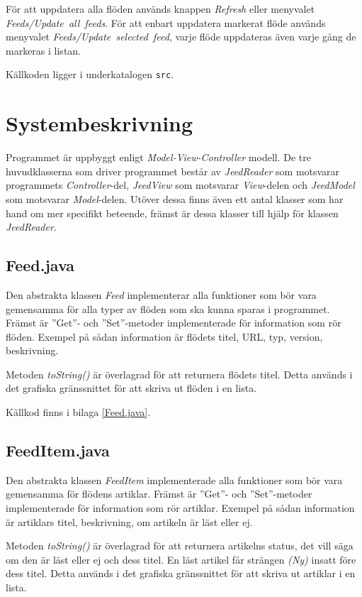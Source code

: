 \documentclass[a4paper, 12pt]{article}
\begin{document}
För att uppdatera alla flöden används knappen \textit{Refresh} eller
menyvalet \textit{Feeds/Update~all~feeds}. För att enbart uppdatera
markerat flöde används menyvalet \textit{Feeds/Update~selected~feed},
varje flöde uppdateras även varje gång de markeras i listan.

Källkoden ligger i underkatalogen \verb!src!.

\section{Systembeskrivning}\label{Systembeskrivning}
Programmet är uppbyggt enligt \textit{Model-View-Controller}
modell. De tre huvudklasserna som driver programmet består av
\textit{JeedReader} som motsvarar programmets \textit{Controller}-del,
\textit{JeedView} som motsvarar \textit{View}-delen och
\textit{JeedModel} som motsvarar \textit{Model}-delen. Utöver dessa
finns även ett antal klasser som har hand om mer specifikt beteende,
främst är dessa klasser till hjälp för klassen \textit{JeedReader}.

\subsection{Feed.java}\label{Feed}
Den abstrakta klassen \textit{Feed} implementerar alla funktioner som
bör vara gemensamma för alla typer av flöden som ska kunna sparas i
programmet. Främst är ''Get''- och ''Set''-metoder implementerade för
information som rör flöden. Exempel på sådan information är flödets
titel, URL, typ, version, beskrivning.

Metoden \textit{toString()} är överlagrad för att returnera flödets
titel. Detta används i det grafiska gränssnittet för att skriva ut
flöden i en lista.

Källkod finns i bilaga \ref{Feed.java}.

\subsection{FeedItem.java}\label{FeedItem}
Den abstrakta klassen \textit{FeedItem} implementerade alla funktioner
som bör vara gemensamma för flödens artiklar. Främst är ''Get''- och
''Set''-metoder implementerade för information som rör
artiklar. Exempel på sådan information är artiklars titel,
beskrivning, om artikeln är läst eller ej.

Metoden \textit{toString()} är överlagrad för att returnera artikelns
status, det vill säga om den är läst eller ej och dess titel. En läst
artikel får strängen \textit{(Ny)} insatt före dess titel. Detta
används i det grafiska gränssnittet för att skriva ut artiklar i en
lista.
\end{document}
